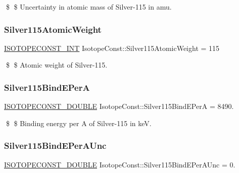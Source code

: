 \$ \$ Uncertainty in atomic mass of Silver-\/115 in amu. \mbox{\label{group___isotope_const-_silver-_ag115_ga42e6139051d41eb4236ddb42c54ddae5}} 
\subsubsection{\texorpdfstring{Silver115\+Atomic\+Weight}{Silver115AtomicWeight}}
{\footnotesize\ttfamily \mbox{\hyperlink{group___isotope_const-_macros_ga5f18360b3e99483a35c32d789e62621c}{I\+S\+O\+T\+O\+P\+E\+C\+O\+N\+S\+T\+\_\+\+I\+NT}} Isotope\+Const\+::\+Silver115\+Atomic\+Weight = 115}

\$ \$ Atomic weight of Silver-\/115. \mbox{\label{group___isotope_const-_silver-_ag115_gaf8c0fc7cea0067a97e35e6d9e4097e0a}} 
\subsubsection{\texorpdfstring{Silver115\+Bind\+E\+PerA}{Silver115BindEPerA}}
{\footnotesize\ttfamily \mbox{\hyperlink{group___isotope_const-_macros_ga8f45a7272ce02c0b4c65c44636ed719a}{I\+S\+O\+T\+O\+P\+E\+C\+O\+N\+S\+T\+\_\+\+D\+O\+U\+B\+LE}} Isotope\+Const\+::\+Silver115\+Bind\+E\+PerA = 8490.}

\$ \$ Binding energy per A of Silver-\/115 in keV. \mbox{\label{group___isotope_const-_silver-_ag115_gaa6278f020a1e84d8fb101dac446d3412}} 
\subsubsection{\texorpdfstring{Silver115\+Bind\+E\+Per\+A\+Unc}{Silver115BindEPerAUnc}}
{\footnotesize\ttfamily \mbox{\hyperlink{group___isotope_const-_macros_ga8f45a7272ce02c0b4c65c44636ed719a}{I\+S\+O\+T\+O\+P\+E\+C\+O\+N\+S\+T\+\_\+\+D\+O\+U\+B\+LE}} Isotope\+Const\+::\+Silver115\+Bind\+E\+Per\+A\+Unc = 0.}

